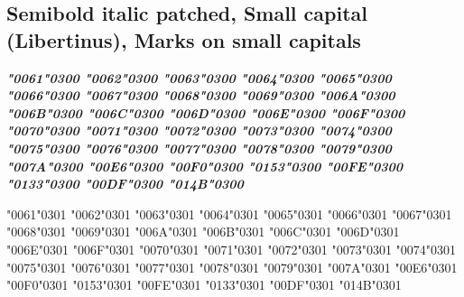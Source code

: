 \newpage
\subsection*{Semibold italic patched, Small capital (Libertinus), Marks on small capitals}

{\LibertinusSerifPatch\bfseries\itshape
\textsc{\char"0061\char"0300} \textsc{\char"0062\char"0300} \textsc{\char"0063\char"0300} \textsc{\char"0064\char"0300} \textsc{\char"0065\char"0300} \textsc{\char"0066\char"0300} \textsc{\char"0067\char"0300} \textsc{\char"0068\char"0300} \textsc{\char"0069\char"0300} \textsc{\char"006A\char"0300} \textsc{\char"006B\char"0300} \textsc{\char"006C\char"0300} \textsc{\char"006D\char"0300} \textsc{\char"006E\char"0300} \textsc{\char"006F\char"0300} \textsc{\char"0070\char"0300} \textsc{\char"0071\char"0300} \textsc{\char"0072\char"0300} \textsc{\char"0073\char"0300} \textsc{\char"0074\char"0300} \textsc{\char"0075\char"0300} \textsc{\char"0076\char"0300} \textsc{\char"0077\char"0300} \textsc{\char"0078\char"0300} \textsc{\char"0079\char"0300} \textsc{\char"007A\char"0300} \textsc{\char"00E6\char"0300} \textsc{\char"00F0\char"0300} \textsc{\char"0153\char"0300} \textsc{\char"00FE\char"0300} \textsc{\char"0133\char"0300} \textsc{\char"00DF\char"0300} \textsc{\char"014B\char"0300}

\textsc{\char"0061\char"0301} \textsc{\char"0062\char"0301} \textsc{\char"0063\char"0301} \textsc{\char"0064\char"0301} \textsc{\char"0065\char"0301} \textsc{\char"0066\char"0301} \textsc{\char"0067\char"0301} \textsc{\char"0068\char"0301} \textsc{\char"0069\char"0301} \textsc{\char"006A\char"0301} \textsc{\char"006B\char"0301} \textsc{\char"006C\char"0301} \textsc{\char"006D\char"0301} \textsc{\char"006E\char"0301} \textsc{\char"006F\char"0301} \textsc{\char"0070\char"0301} \textsc{\char"0071\char"0301} \textsc{\char"0072\char"0301} \textsc{\char"0073\char"0301} \textsc{\char"0074\char"0301} \textsc{\char"0075\char"0301} \textsc{\char"0076\char"0301} \textsc{\char"0077\char"0301} \textsc{\char"0078\char"0301} \textsc{\char"0079\char"0301} \textsc{\char"007A\char"0301} \textsc{\char"00E6\char"0301} \textsc{\char"00F0\char"0301} \textsc{\char"0153\char"0301} \textsc{\char"00FE\char"0301} \textsc{\char"0133\char"0301} \textsc{\char"00DF\char"0301} \textsc{\char"014B\char"0301}

}
